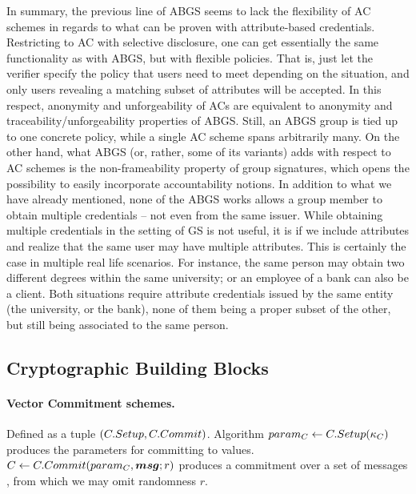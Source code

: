 In summary, the previous line of ABGS seems to lack the flexibility of AC
schemes in regards to what can be proven with attribute-based credentials.
Restricting to AC with selective disclosure, one can get essentially the same
functionality as with ABGS, but with flexible policies. That is, just let
the verifier specify the policy that users need to meet depending on the
situation, and only users revealing a matching subset of attributes will be
accepted. In this respect, anonymity and unforgeability of ACs are equivalent to
anonymity and traceability/unforgeability properties of ABGS. Still, an ABGS
group is tied up to one concrete policy, while a single AC scheme spans
arbitrarily many.
%
On the other hand, what ABGS (or, rather, some of its variants) adds with
respect to AC schemes is the non-frameability property of group signatures,
which opens the possibility to easily incorporate accountability notions.
%
In addition to what we have already mentioned, none of the ABGS works allows
a group member to obtain multiple credentials -- not even from the same issuer.
While obtaining multiple credentials in the setting of GS is not useful, it is
if we include attributes and realize that the same user may have multiple
attributes. This is certainly the case in multiple real life scenarios. For
instance, the same person may obtain two different degrees within the same
university; or an employee of a bank can also be a client. Both situations
require attribute credentials issued by the same entity (the university, or
the bank), none of them being a proper subset of the other, but still being
associated to the same person.


\subsection{Cryptographic Building Blocks}
\label{ssec:cryptobblocks}

\paragraph{Vector Commitment schemes.} %
Defined as a tuple $(C.Setup,C.Commit)$. Algorithm $param_C \gets
C.Setup(\kappa_{C})$ produces the parameters for committing to values. $C
\gets C.Commit(param_C, \boldsymbol{msg}; r)$ produces a commitment \Ccom over a set of
messages \msgset, from which we may omit randomness $r$. 

